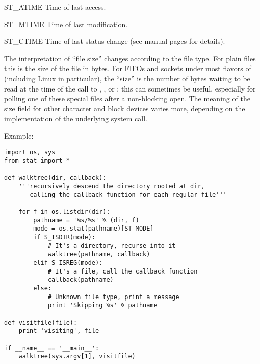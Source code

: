 \begin{datadesc}{ST_ATIME}
Time of last access.
\end{datadesc}

\begin{datadesc}{ST_MTIME}
Time of last modification.
\end{datadesc}

\begin{datadesc}{ST_CTIME}
Time of last status change (see manual pages for details).
\end{datadesc}

The interpretation of ``file size'' changes according to the file
type.  For plain files this is the size of the file in bytes.  For
FIFOs and sockets under most flavors of \UNIX{} (including Linux in
particular), the ``size'' is the number of bytes waiting to be read at
the time of the call to , ,
or ; this can sometimes be useful, especially for
polling one of these special files after a non-blocking open.  The
meaning of the size field for other character and block devices varies
more, depending on the implementation of the underlying system call.

Example:

\begin{verbatim}
import os, sys
from stat import *

def walktree(dir, callback):
    '''recursively descend the directory rooted at dir,
       calling the callback function for each regular file'''

    for f in os.listdir(dir):
        pathname = '%s/%s' % (dir, f)
        mode = os.stat(pathname)[ST_MODE]
        if S_ISDIR(mode):
            # It's a directory, recurse into it
            walktree(pathname, callback)
        elif S_ISREG(mode):
            # It's a file, call the callback function
            callback(pathname)
        else:
            # Unknown file type, print a message
            print 'Skipping %s' % pathname

def visitfile(file):
    print 'visiting', file

if __name__ == '__main__':
    walktree(sys.argv[1], visitfile)
\end{verbatim}
